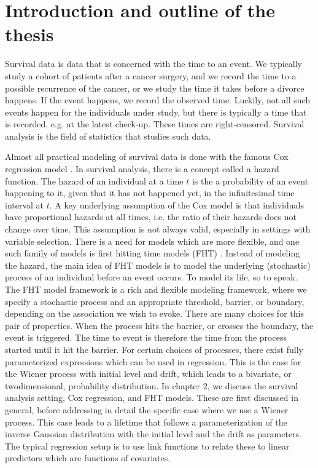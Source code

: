 \chapter{Introduction and outline of the thesis}
\label{sec:intro}
Survival data is data that is concerned with the time to an event.
We typically study a cohort of patients after a cancer surgery, and we record the time to a possible recurrence of the cancer, or we study the time it takes before a divorce happens.
If the event happens, we record the observed time.
Luckily, not all such events happen for the individuals under study, but there is typically a time that is recorded, e.g. at the latest check-up.
These times are right-censored. 
Survival analysis is the field of statistics that studies such data.

Almost all practical modeling of survival data is done with the famous Cox regression model \citep{cox-model}.
In survival analysis, there is a concept called a hazard function.
The hazard of an individual at a time $t$ is the a probability of an event happening to it, given that it has not happened yet, in the infinitesimal time interval at $t$.
A key underlying assumption of the Cox model is that individuals have proportional hazards at all times, i.e. the ratio of their hazards does not change over time.
This assumption is not always valid, especially in settings with variable selection.
There is a need for models which are more flexible, and one such family of models is first hitting time models (FHT) \citep{leewhitmore2006}.
Instead of modeling the hazard, the main idea of FHT models is to model the underlying (stochastic) process of an individual before an event occurs.
To model its life, so to speak.
The FHT model framework is a rich and flexible modeling framework, where we specify a stochastic process and an appropriate threshold, barrier, or boundary, depending on the association we wish to evoke.
There are many choices for this pair of properties.
When the process hits the barrier, or crosses the boundary, the event is triggered.
The time to event is therefore the time from the process started until it hit the barrier.
For certain choices of processes, there exist fully parameterized expressions which can be used in regression.
This is the case for the Wiener process with initial level and drift, which leads to a bivariate, or twodimensional, probability distribution.
In chapter 2, we discuss the survival analysis setting, Cox regression, and FHT models.
These are first discussed in general, before addressing in detail the specific case where we use a Wiener process.
This case leads to a lifetime that follows a parameterization of the inverse Gaussian distribution with the initial level and the drift as parameters.
The typical regression setup is to use link functions to relate these to linear predictors which are functions of covariates.

